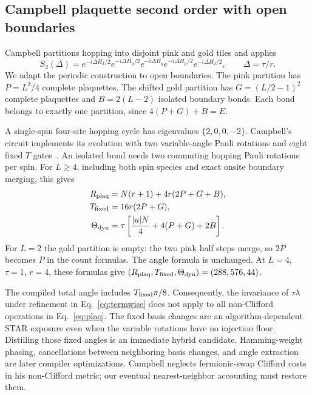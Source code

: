 \documentclass[11pt]{article}
\begin{document}
\subsection{Campbell plaquette second order with open boundaries}
Campbell partitions hopping into disjoint pink and gold tiles and applies
\begin{equation}\label{eq:plaq}
 S_2(\Delta)=e^{-i\Delta H_I/2}e^{-i\Delta H_p/2}
 e^{-i\Delta H_g}e^{-i\Delta H_p/2}e^{-i\Delta H_I/2},
 \qquad \Delta=\tau/r.
\end{equation}
We adapt the periodic construction to open boundaries. The pink partition
has $P=L^2/4$ complete plaquettes. The shifted gold partition has
$G=(L/2-1)^2$ complete plaquettes and $B=2(L-2)$ isolated boundary bonds.
Each bond belongs to exactly one partition, since $4(P+G)+B=E$.

A single-spin four-site hopping cycle has eigenvalues $\{2,0,0,-2\}$.
Campbell's circuit implements its evolution with two variable-angle Pauli
rotations and eight fixed $T$ gates~\cite[Appendix E.1]{campbell}. An isolated
bond needs two commuting hopping Pauli rotations per spin. For $L\geq4$,
including both spin species and exact onsite boundary merging, this gives
\begin{align}
 R_{\rm plaq}&=N(r+1)+4r(2P+G+B),\\
 T_{\rm fixed}&=16r(2P+G),\\
 \Theta_{\rm dyn}&=\tau\left[\frac{|u|N}{4}+4(P+G)+2B\right].\label{eq:plaqangle}
\end{align}
For $L=2$ the gold partition is empty: the two pink half steps merge, so
$2P$ becomes $P$ in the count formulas. The angle formula is unchanged.
At $L=4$, $\tau=1$, $r=4$, these formulas give
$(R_{\rm plaq},T_{\rm fixed},\Theta_{\rm dyn})=(288,576,44)$.

The compiled total angle includes $T_{\rm fixed}\pi/8$. Consequently, the
invariance of $\tau\lambda$ under refinement in Eq.~\eqref{eq:termwise}
does not apply to all non-Clifford operations in Eq.~\eqref{eq:plaq}.
The fixed basis changes are an algorithm-dependent STAR exposure even when
the variable rotations have no injection floor. Distilling those fixed
angles is an immediate hybrid candidate. Hamming-weight phasing, cancellations
between neighboring basis changes, and angle extraction are later compiler
optimizations. Campbell neglects fermionic-swap Clifford costs in his
non-Clifford metric; our eventual nearest-neighbor accounting must restore them.
\end{document}
